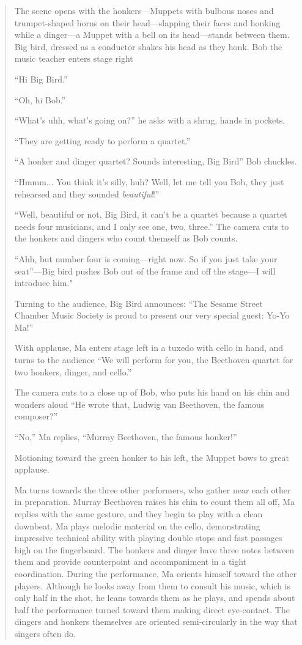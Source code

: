 \documentclass[12pt,letterpaper]{article}
\begin{document}
	\begin{quote}

	The scene opens with the honkers---Muppets with bulbous noses and
	trumpet-shaped horns on their head---slapping their faces and honking 
	while a dinger---a Muppet with a bell on its head---stands between them.
	Big bird, dressed as a conductor shakes his head as they honk. Bob the
	music teacher enters stage right 

	``Hi Big Bird.''

	``Oh, hi Bob.''

	``What's uhh, what's going on?'' he asks with a shrug, hands in pockets.

	``They are getting ready to perform a quartet.''

	``A honker and dinger quartet? Sounds interesting, Big Bird'' Bob 
	chuckles.

	``Hmmm... You think it's silly, huh? Well, let me tell you Bob, they 
	just rehearsed and they sounded \textit{beautiful}!''

	``Well, beautiful or not, Big Bird, it can't be a quartet because a 
	quartet needs four musicians, and I only see one, two, three.'' The 
	camera cuts to the honkers and dingers who count themself as Bob counts.

	``Ahh, but number four is coming---right now. So if you just take your 
	seat''---Big bird pushes Bob out of the frame and off the stage---I will
	introduce him."

	Turning to the audience, Big Bird announces: ``The Sesame Street Chamber
	Music Society is proud to present our very special guest: Yo-Yo Ma!''

	With applause, Ma enters stage left in a tuxedo with cello in hand, and
	turns to the audience ``We will perform for you, the Beethoven quartet 
	for two honkers, dinger, and cello.'' 

	The camera cuts to a close up of Bob, who puts his hand on his chin and 	wonders aloud ``He wrote that, Ludwig van Beethoven, the famous 
	composer?''

	``No,'' Ma replies, ``Murray Beethoven, the famous honker!''

	Motioning toward the green honker to his left, the Muppet bows to great 
	applause.

	Ma turns towards the three other performers, who gather near each other
	in preparation. Murray Beethoven raises his chin to count them all off, 
	Ma replies with the same gesture, and they begin to play with a clean 
	downbeat. Ma plays melodic material on the cello, demonstrating 
	impressive technical ability with playing double stops and fast 
	passages high on the fingerboard. The honkers and dinger have three
	notes between them and provide counterpoint and accompaniment in a tight
	coordination. During the performance, Ma orients himself toward the 
	other players. Although he looks away from them to consult his music, 
	which is only half in the shot, he leans towards them as he plays, and 
	spends about half the performance turned toward them making direct 
	eye-contact. The dingers and honkers themselves are oriented 
	semi-circularly in the way that singers often do.


\end{quote}
\end{document}
